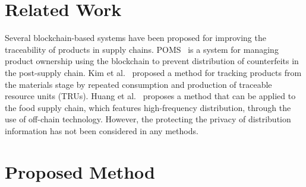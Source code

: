 \documentclass[conference]{IEEEtran}
\begin{document}
\section{Related Work}
\label{sec:related_work}
Several blockchain-based systems have been proposed for improving the traceability of products in supply chains.
POMS~\cite{Toyoda2017} is a system for managing product ownership using the blockchain to prevent distribution of counterfeits in the post-supply chain.
Kim et al.~\cite{TRU} proposed a method for tracking products from the materials stage by repeated consumption and production of traceable resource units (TRUs).
Huang et al.~\cite{HZL19} proposes a method that can be applied to the food supply chain, which features high-frequency distribution, through the use of off-chain technology.
However, the protecting the privacy of distribution information has not been considered in any methods.




\section{Proposed Method}
\label{sec:proposed_method}
\end{document}
